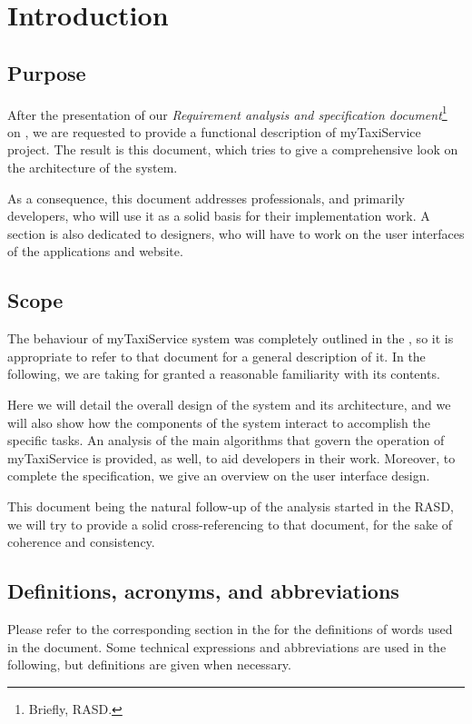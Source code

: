 \chapter{Introduction} \label{chap:introduction}


\section{Purpose}
After the presentation of our \emph{Requirement analysis and specification document}\footnote{Briefly, RASD.} on , we are requested to provide a functional description of myTaxiService project. The result is this document, which tries to give a comprehensive look on the architecture of the system.

As a consequence, this document addresses professionals, and primarily developers, who will use it as a solid basis for their implementation work. A section is also dedicated to designers, who will have to work on the user interfaces of the applications and website.


\section{Scope}
The behaviour of myTaxiService system was completely outlined in the \rasd, so it is appropriate to refer to that document for a general description of it. In the following, we are taking for granted a reasonable familiarity with its contents.

Here we will detail the overall design of the system and its architecture, and we will also show how the components of the system interact to accomplish the specific tasks. An analysis of the main algorithms that govern the operation of myTaxiService is provided, as well, to aid developers in their work. Moreover, to complete the specification, we give an overview on the user interface design. 

This document being the natural follow-up of the analysis started in the RASD, we will try to provide a solid cross-referencing to that document, for the sake of coherence and consistency.


\section{Definitions, acronyms, and abbreviations}
Please refer to the corresponding section in the \rasd for the definitions of words used in the document. Some technical expressions and abbreviations are used in the following, but definitions are given when necessary. 


